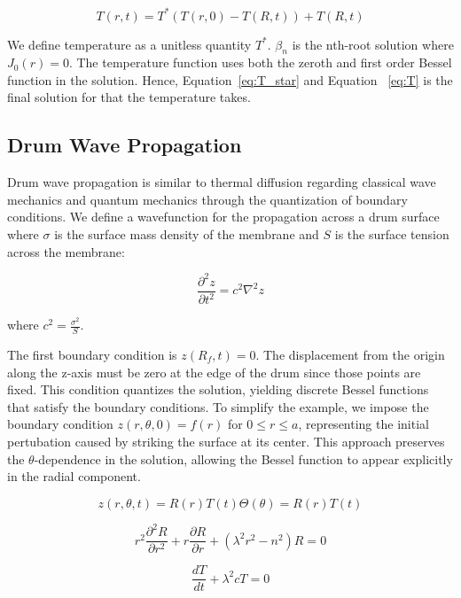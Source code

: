 \documentclass[linenumbers, RNAAS, trackchanges]{aastex631}
\begin{document}
\begin{equation}
    T(r,t)=T^*(T(r,0)-T(R,t))+T(R,t)
    \label{eq:T}
\end{equation}

\noindent We define temperature as a unitless quantity $T^*$. $\beta_n$ is the
nth-root solution where $J_0(r)=0$. The temperature function uses both the zeroth
and first order Bessel function in the solution. Hence, Equation~\ref{eq:T_star}
and Equation ~\ref{eq:T} is the final solution for that the temperature takes.


\subsection{Drum Wave Propagation}

Drum wave propagation is similar to thermal diffusion regarding classical wave 
mechanics and quantum mechanics through the quantization of boundary conditions.
We define a wavefunction for the propagation across a drum surface where $\sigma$
is the surface mass density of the membrane and $S$ is the surface tension
across the membrane:

\begin{equation}
    \frac{\partial^2z}{\partial t^2}=c^2\nabla^2z
\end{equation}

\noindent where $c^2=\frac{\sigma^2}{S}$.

\noindent The first boundary condition is $z(R_f,t)=0$. The displacement from the origin
along the z-axis must be zero at the edge of the drum since those points are
fixed. This condition quantizes the solution, yielding discrete Bessel functions
that satisfy the boundary conditions. To simplify the example, we impose the boundary
condition $z(r,\theta,0)=f(r)$ for $0\leq r \leq a$, representing the initial
pertubation caused by striking the surface at its center. This approach preserves
the $\theta$-dependence in the solution, allowing the Bessel function to appear
explicitly in the radial component.

\begin{equation}
    z(r,\theta,t)=R(r)T(t)\Theta(\theta)=R(r)T(t)
\end{equation}

\begin{equation}
    r^2\frac{\partial^2R}{\partial r^2}+r\frac{\partial R}{\partial r}+(\lambda^2r^2-n^2)R=0
\end{equation}

\begin{equation}
    \frac{dT}{dt}+\lambda^2cT=0
\end{equation}
\end{document}
